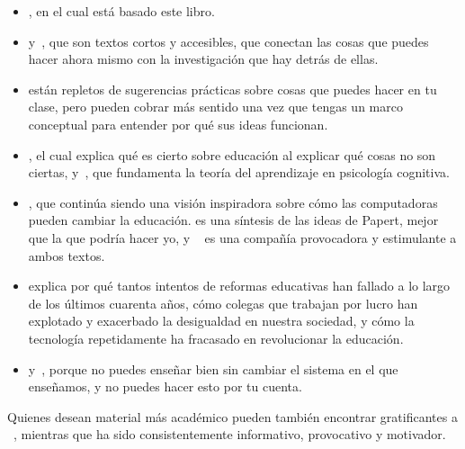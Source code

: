 \begin{itemize}

\item
  ,
  en el cual está basado este libro. 
\item
  \cite{Lang2016} y~\cite{Hust2012}, que son textos cortos y accesibles, que conectan las cosas que puedes hacer ahora mismo con la investigación que hay detrás de ellas. 

\item
  \cite{Berg2012,Lemo2014,Majo2015,Broo2016,Rice2018,Wein2018b}
  están repletos de sugerencias prácticas sobre cosas que puedes hacer en tu clase,
pero pueden cobrar más sentido una vez que tengas un marco conceptual para entender por qué sus ideas funcionan. 

\item
  \cite{DeBr2015},
  el cual explica qué es cierto sobre educación al explicar qué cosas no son ciertas, y~\cite{Dida2016},
  que fundamenta la teoría del aprendizaje en psicología cognitiva. 

\item
  \cite{Pape1993},
  que continúa siendo una visión inspiradora sobre cómo las computadoras pueden cambiar la educación.
 es una síntesis de las ideas de Papert, mejor que la que podría hacer yo, y ~\cite{Craw2010} es una compañía provocadora y estimulante a ambos textos.

\item
  \cite{Gree2014,McMi2017,Watt2014} explica por qué tantos intentos de reformas educativas han fallado a lo largo de los últimos cuarenta años, cómo colegas que trabajan por lucro han explotado y exacerbado la desigualdad en nuestra sociedad, y cómo la tecnología repetidamente ha fracasado en revolucionar la educación. 

\item
  \cite{Brow2007} y~\cite{Mann2015},
  porque no puedes enseñar bien sin cambiar el sistema en el que enseñamos,
y no puedes hacer esto por tu cuenta.

\end{itemize}

Quienes desean material más académico pueden también encontrar gratificantes a ~\cite{Guzd2015a,Hazz2014,Sent2018,Finc2019,Hpl2018},
mientras que  ha sido consistentemente informativo, provocativo y motivador.

